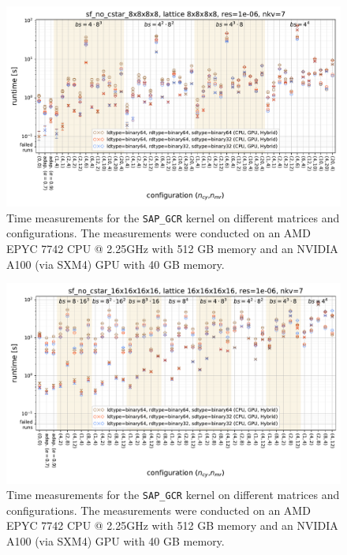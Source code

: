 \documentclass{article}
\theoremstyle{plain} %
\theoremstyle{convention} %
\theoremstyle{remark} %
\def\code#1{\texttt{#1}}
\numberwithin{equation}{section}
\begin{document}
\begin{figure}[h]
    \centering
    \includegraphics[width=1.0\textwidth]{plots/sap_gcr_sf_no_cstar_8x8x8x8_lattice_8x8x8x8_res=1e-06_nkv=7}
    \caption{Time measurements for the \code{SAP\_GCR} kernel on different matrices and configurations. The measurements were conducted on an AMD EPYC 7742 CPU @ 2.25GHz with 512 GB memory and an NVIDIA A100 (via SXM4) GPU with 40 GB memory.}
    \label{fig:sap_gcr0}
    \label{fig:sap_gcr_start}
    \label{fig:sap_gcr_sf_8x8x8x8}
\end{figure}

\begin{figure}[h]
    \centering
    \includegraphics[width=1.0\textwidth]{plots/sap_gcr_sf_no_cstar_16x16x16x16_lattice_16x16x16x16_res=1e-06_nkv=7}
    \caption{Time measurements for the \code{SAP\_GCR} kernel on different matrices and configurations. The measurements were conducted on an AMD EPYC 7742 CPU @ 2.25GHz with 512 GB memory and an NVIDIA A100 (via SXM4) GPU with 40 GB memory.}
    \label{fig:sap_gcr3}
    \label{fig:sap_gcr_sf_16x16x16x16}
\end{figure}
\end{document}
